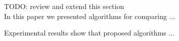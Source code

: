 TODO: review and extend this section
\\

In this paper we presented  algorithms for comparing ...

Experimental results show that proposed algorithms ...


